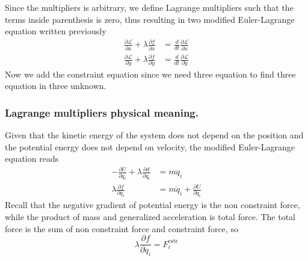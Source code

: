 \documentclass[../../../main.tex]{subfiles}
\begin{document}
Since the multipliers is arbitrary, we define Lagrange multipliers such that the terms inside parenthesis is zero, thus resulting in two modified Euler-Lagrange equation written previously
\begin{align*}
	\frac{\partial \mathcal{L}}{\partial x}+\lambda\frac{\partial f}{\partial x} & =\frac{d}{dt}\frac{\partial \mathcal{L}}{\partial \dot{x}} \\
	\frac{\partial \mathcal{L}}{\partial y}+\lambda\frac{\partial f}{\partial y} & =\frac{d}{dt}\frac{\partial \mathcal{L}}{\partial \dot{y}} 
\end{align*}
Now we add the constraint equation since we need three equation to find three equation in three unknown.

\subsubsection{Lagrange multipliers physical meaning.}
Given that the kinetic energy of the system does not depend on the position and the potential energy does not depend on velocity, the modified Euler-Lagrange equation reads
\begin{align*}
	-\frac{\partial U}{\partial q_i}+\lambda\frac{\partial d}{\partial q_i}&=m\ddot{q}_i\\
	\lambda\frac{\partial f}{\partial q_i}&=m\ddot{q}_i+\frac{\partial U}{\partial q_i}
\end{align*}
Recall that the negative gradient of potential energy is the non constraint force, while the product of mass and generalized acceleration is total force. 
The total force is the sum of non constraint force and constraint force, so 
\begin{equation*}
	\lambda\frac{\partial f}{\partial q_i}=F_i^{\text{cstr}}	
\end{equation*}
\end{document}
